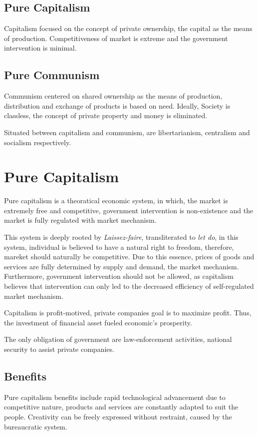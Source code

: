 \documentclass[12pt,twocolumn,a4paper]{article}
\begin{document}
\subsection{Pure Capitalism}
Capitalism focused on the concept of private ownership, the capital as the means of production. Competitiveness of market is extreme and the government intervention is minimal.
\subsection{Pure Communism}
Communism centered on shared ownership as the means of production, distribution and exchange of products is based on need. Ideally, Society is classless, the concept of private property and money is eliminated.\newline


Situated between capitalism and communism, are libertarianism, centralism and socialism respectively.

\section{Pure Capitalism}
Pure capitalism is a theoratical economic system, in which, the market is extremely free and competitive, government intervention is non-existence and the market is fully regulated with market mechanism.

This system is deeply rooted by \textit{Laissez-faire}, transliterated to \textit{let do}, in this system, individual is believed to have a natural right to freedom, therefore, mareket should naturally be competitive. Due to this essence, prices of goods and services are fully determined by supply and demand, the market mechanism. Furthermore, government intervention should not be allowed, as capitalism believes that intervention can only led to the decreased efficiency of self-regulated market mechanism.

Capitalism is profit-motived, private companies goal is to maximize profit. Thus, the investment of financial asset fueled economic's prosperity.

The only obligation of government are law-enforcement activities, national security to assist private companies.

\subsection{Benefits}
Pure capitalism benefits include rapid technological advancement due to competitive nature, products and services are constantly adapted to suit the people. Creativity can be freely expressed without restraint, caused by the bureaucratic system.
\end{document}
